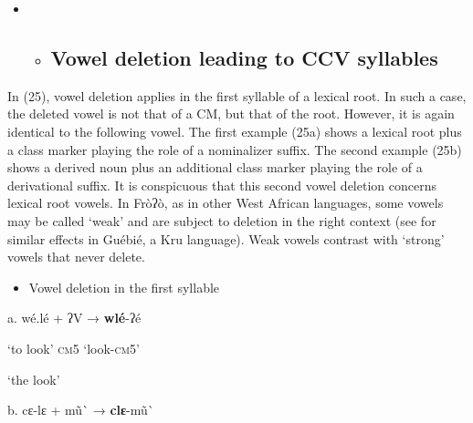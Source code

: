 \begin{itemize}
\item \begin{itemize}
\item \subsection{ Vowel deletion leading to CCV syllables} \end{itemize}
\end{itemize}

In (25), vowel deletion applies in the first syllable of a lexical root. In such a case, the deleted vowel is not that of a CM, but that of the root. However, it is again identical to the following vowel. The first example (25a) shows a lexical root plus a class marker playing the role of a nominalizer suffix. The second example (25b) shows a derived noun plus an additional class marker playing the role of a derivational suffix. It is conspicuous that this second vowel deletion concerns lexical root vowels. In Fròʔò, as in other West African languages, some vowels may be called ‘weak’ and are subject to deletion in the right context (see \citealt{Sande2017} for similar effects in Guébié, a Kru language). Weak vowels contrast with ‘strong’ vowels that never delete.

\begin{itemize}
\item \begin{styleindexi}
  \label{bkm:Ref359906310}Vowel deletion in the first syllable
\end{styleindexi}\end{itemize}
\begin{styleindexi}
    a.   wé.lé                   +     ʔV                         →               \textbf{wlé}{}-ʔé                  
\end{styleindexi}

\begin{styleindexi}
        ‘to look’                     \textsc{cm}5                                         ‘look-\textsc{cm}5’
\end{styleindexi}

\begin{styleindexi}
                                                                                  ‘the look’                        
\end{styleindexi}

\begin{styleindexi}
    b.  cɛ-lɛ                   +     mũ\`{}                       →               \textbf{clɛ}{}-mũ\`{} ~                 
\end{styleindexi}

